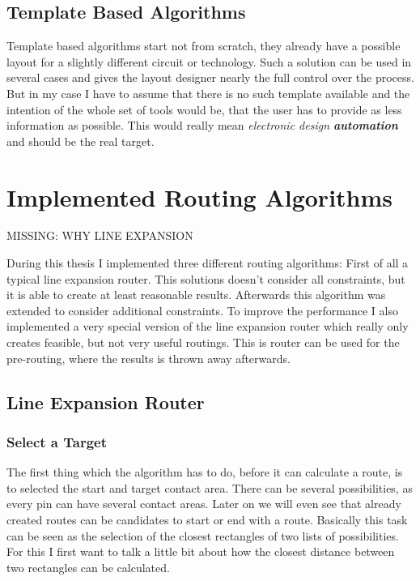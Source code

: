 \subsection{Template Based Algorithms}
Template based algorithms start not from scratch, they already have a possible layout for a slightly different circuit or technology. Such a solution can be used in several cases and gives the layout designer nearly the full control over the process. But in my case I have to assume that there is no such template available and the intention of the whole set of tools would be, that the user has to provide as less information as possible. This would really mean \textit{electronic design \textbf{automation}} and should be the real target.

\section{Implemented Routing Algorithms}
MISSING: WHY LINE EXPANSION

During this thesis I implemented three different routing algorithms: First of all a typical line expansion router. This solutions doesn't consider all constraints, but it is able to create at least reasonable results. Afterwards this algorithm was extended to consider additional constraints. To improve the performance I also implemented a very special version of the line expansion router which really only creates feasible, but not very useful routings. This is router can be used for the pre-routing, where the results is thrown away afterwards.

\subsection{Line Expansion Router}

\subsubsection{Select a Target}
The first thing which the algorithm has to do, before it can calculate a route, is to selected the start and target contact area. There can be several possibilities, as every pin can have several contact areas. Later on we will even see that already created routes can be candidates to start or end with a route. Basically this task can be seen as the selection of the closest rectangles of two lists of possibilities. For this I first want to talk a little bit about how the closest distance between two rectangles can be calculated.

